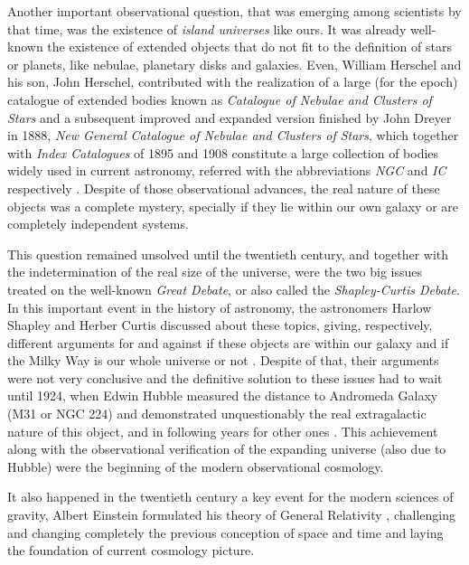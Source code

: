 Another important observational question, that was emerging among 
scientists by that time, was the existence of \textit{island universes} 
like ours. It was already well-known the existence of extended objects 
that do not fit to the definition of stars or planets, like nebulae, 
planetary disks and galaxies. Even, William Herschel and his son, John 
Herschel, contributed with the realization of a large (for the epoch) 
catalogue of extended bodies known as \textit{Catalogue of Nebulae and 
Clusters of Stars} and a subsequent improved and expanded version finished 
by John Dreyer in 1888, \textit{New General Catalogue of Nebulae and 
Clusters of Stars}, which together with \textit{Index Catalogues} of 1895 
and 1908 constitute a large collection of bodies widely used in current 
astronomy, referred with the abbreviations \textit{NGC} and \textit{IC} 
respectively \cite{longair2008}. Despite of those observational advances, 
the real nature of these objects was a complete mystery, specially if they 
lie within our own galaxy or are completely independent systems. 


This question remained unsolved until the twentieth century, and together 
with the indetermination of the real size of the universe, were the two 
big issues treated on the well-known \textit{Great Debate}, or also called 
the \textit{Shapley-Curtis Debate}. In this important event in the history 
of astronomy, the astronomers Harlow Shapley and Herber Curtis discussed 
about these topics, giving, respectively, different arguments for and 
against if these objects are within our galaxy and if the Milky Way is our 
whole universe or not \cite{Curtis1921} \cite{Shapley1921}. Despite of 
that, their arguments were not very conclusive and the definitive solution 
to these issues had to wait until 1924, when Edwin Hubble measured the 
distance to Andromeda Galaxy (M31 or NGC 224) and demonstrated 
unquestionably the real extragalactic nature of this object, and in 
following years for other ones \cite{Hubble1926}. This achievement along 
with the observational verification of the expanding universe (also due to 
Hubble) were the beginning of the modern observational cosmology.


It also happened in the twentieth century a key event for the modern 
sciences of gravity, Albert Einstein formulated his theory of General 
Relativity \cite{Einstein1916}, challenging and changing completely the 
previous conception of space and time and laying the foundation of current 
cosmology picture.



